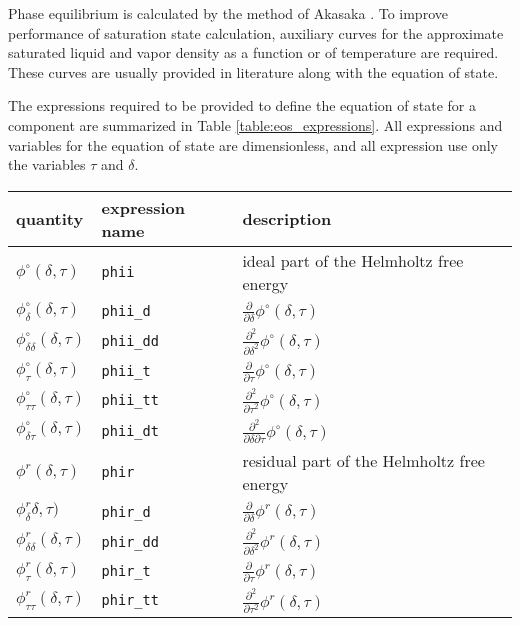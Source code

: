 \documentclass[oneside]{book}
\begin{document}
Phase equilibrium is calculated by the method of Akasaka \cite{akasaka2008reliable}. To improve performance of saturation state calculation, auxiliary curves for the approximate saturated liquid and vapor density as a function or of temperature are required.  These curves are usually provided in literature along with the equation of state.

The expressions required to be provided to define the equation of state for a component are summarized in Table \ref{table:eos_expressions}. All expressions and variables for the equation of state are dimensionless, and all expression use only the variables $\tau$ and $\delta$. 

\begin{table}[h!]
\centering
\begin{tabular}{ l l l }
\hline
quantity & expression name & description \\
\hline
\hline
$\phi^\circ(\delta, \tau)$ &  \texttt{phii} & ideal part of the Helmholtz free energy \\[1ex]  
$\phi_\delta^\circ(\delta, \tau)$ & \texttt{phii\_d} & $\frac{\partial}{\partial \delta} \phi^\circ(\delta, \tau) $ \\[1ex] 
$\phi_{\delta\delta}^\circ(\delta, \tau)$ & \texttt{phii\_dd} & $\frac{\partial^2}{\partial \delta^2} \phi^\circ(\delta, \tau) $ \\[1ex] 
$\phi_\tau^\circ(\delta, \tau)$ & \texttt{phii\_t} & $\frac{\partial}{\partial \tau} \phi^\circ(\delta, \tau) $ \\[1ex] 
$\phi_{\tau\tau}^\circ(\delta, \tau)$ & \texttt{phii\_tt} & $\frac{\partial^2}{\partial \tau^2} \phi^\circ(\delta, \tau) $ \\[1ex]
$\phi_{\delta\tau}^\circ(\delta, \tau)$ & \texttt{phii\_dt} & $\frac{\partial^2}{\partial \delta \partial \tau} \phi^\circ(\delta, \tau) $ \\[1ex]
$\phi^r(\delta, \tau)$ &  \texttt{phir} & residual part of the Helmholtz free energy \\[1ex]  
$\phi_\delta^r\delta, \tau)$ & \texttt{phir\_d} & $\frac{\partial}{\partial \delta} \phi^r(\delta, \tau) $ \\[1ex] 
$\phi_{\delta\delta}^r(\delta, \tau)$ & \texttt{phir\_dd} & $\frac{\partial^2}{\partial \delta^2} \phi^r(\delta, \tau) $ \\[1ex] 
$\phi_\tau^r(\delta, \tau)$ & \texttt{phir\_t} & $\frac{\partial}{\partial \tau} \phi^r(\delta, \tau) $ \\[1ex] 
$\phi_{\tau\tau}^r(\delta, \tau)$ & \texttt{phir\_tt} & $\frac{\partial^2}{\partial \tau^2} \phi^r(\delta, \tau) $ \\[1ex]

\end{tabular}
\end{table}
\end{document}
